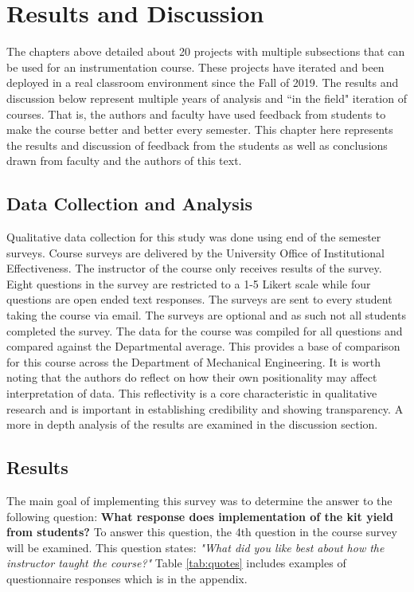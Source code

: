 \newpage

\section{Results and Discussion}

The chapters above detailed about 20 projects with multiple
subsections that can be used for
an instrumentation course. These projects have iterated and been
deployed in a real classroom environment since the Fall of 2019. The
results and discussion below represent multiple years of analysis and
``in the field" iteration of courses. That is, the authors and faculty
have used feedback from students to make the course better and better
every semester. This chapter here represents the results and
discussion of feedback from the students as well as conclusions drawn
from faculty and the authors of this text. 

\subsection{Data Collection and Analysis}

Qualitative data collection for this study was done using end of the
semester surveys. Course surveys are delivered by the University
Office of Institutional Effectiveness. The instructor of the course
only receives results of the survey. Eight questions in the survey are
restricted to a 1-5 Likert scale while four questions are open ended
text responses\cite{likert}. The surveys are sent to every student
taking the course via email. The surveys are optional and as such not
all students completed the survey. The data for the course was
compiled for all questions and compared against the Departmental
average. This provides a base of comparison for this course across the
Department of Mechanical Engineering. It is worth noting that the
authors do reflect on how their own positionality may affect
interpretation of data. This reflectivity is a core characteristic in
qualitative research and is important in establishing credibility and
showing transparency. A more in depth analysis of the results are
examined in the discussion section.  

\subsection{Results}

The main goal of implementing this survey was to determine the answer
to the following question: {\bf What response does implementation of
  the kit yield from students?} To answer this question, the 4th
question in the course survey will be examined. This question states:
{\it "What did you like best about how the instructor taught the
  course?"} Table \ref{tab:quotes} includes examples of questionnaire
responses which is in the appendix.

